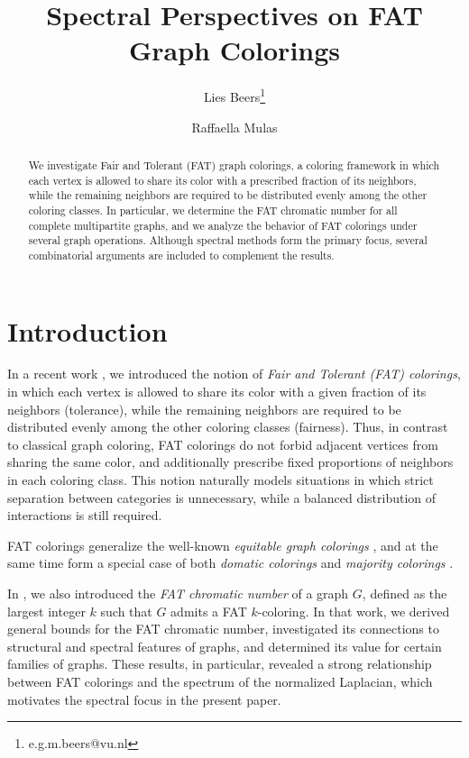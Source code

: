 \documentclass{article}
\title{Spectral Perspectives on FAT Graph Colorings}
\author{Lies Beers\thanks{e.g.m.beers@vu.nl} }
\author{Raffaella Mulas}
\date{}
\affil{Vrije Universiteit Amsterdam}
\theoremstyle{plain}
\theoremstyle{definition}
\theoremstyle{remark}
\begin{document}
\maketitle

\begin{abstract} 
We investigate Fair and Tolerant (FAT) graph colorings, a coloring framework in which each vertex is allowed to share its color with a prescribed fraction of its neighbors, while the remaining neighbors are required to be distributed evenly among the other coloring classes. In particular, we determine the FAT chromatic number for all complete multipartite graphs, and we analyze the behavior of FAT colorings under several graph operations. Although spectral methods form the primary focus, several combinatorial arguments are included to complement the results.
\end{abstract}

\section{Introduction}\label{sec:introduction}

In a recent work \cite{beersmulasFAT}, we introduced the notion of \textit{Fair and Tolerant (FAT) colorings}, in which each vertex is allowed to share its color with a given fraction of its neighbors (tolerance), while the remaining neighbors are required to be distributed evenly among the other coloring classes (fairness). Thus, in contrast to classical graph coloring, FAT colorings do not forbid adjacent vertices from sharing the same color, and additionally prescribe fixed proportions of neighbors in each coloring class. This notion naturally models situations in which strict separation between categories is unnecessary, while a balanced distribution of interactions is still required.\newline 

FAT colorings generalize the well-known \emph{equitable graph colorings} \cite{beersmulas2024}, and at the same time form a special case of both \emph{domatic colorings} \cite{zelinka1981domatic} and \emph{majority colorings} \cite{bosek2019majority}.\newline 

In \cite{beersmulasFAT}, we also introduced the \emph{FAT chromatic number} of a graph $G$, defined as the largest integer $k$ such that $G$ admits a FAT $k$-coloring. In that work, we derived general bounds for the FAT chromatic number, investigated its connections to structural and spectral features of graphs, and determined its value for certain families of graphs. These results, in particular, revealed a strong relationship between FAT colorings and the spectrum of the normalized Laplacian, which motivates the spectral focus in the present paper.\newline 
\end{document}
